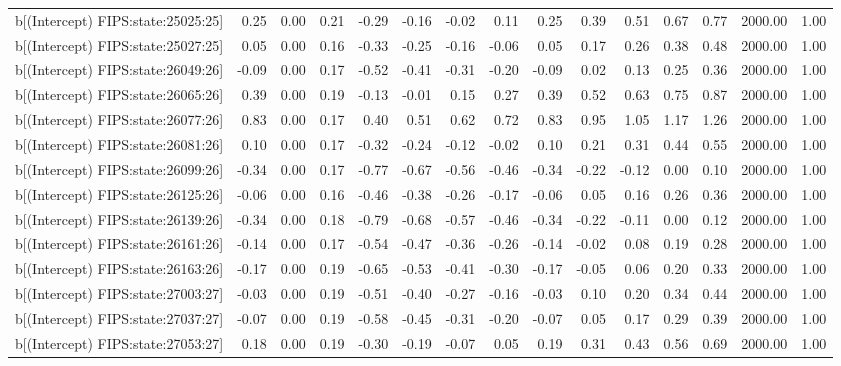\begin{table}[ht]
\begin{tabular}{rrrrrrrrrrrrrrr}
  b[(Intercept) FIPS:state:25025:25] & 0.25 & 0.00 & 0.21 & -0.29 & -0.16 & -0.02 & 0.11 & 0.25 & 0.39 & 0.51 & 0.67 & 0.77 & 2000.00 & 1.00 \\ 
  b[(Intercept) FIPS:state:25027:25] & 0.05 & 0.00 & 0.16 & -0.33 & -0.25 & -0.16 & -0.06 & 0.05 & 0.17 & 0.26 & 0.38 & 0.48 & 2000.00 & 1.00 \\ 
  b[(Intercept) FIPS:state:26049:26] & -0.09 & 0.00 & 0.17 & -0.52 & -0.41 & -0.31 & -0.20 & -0.09 & 0.02 & 0.13 & 0.25 & 0.36 & 2000.00 & 1.00 \\ 
  b[(Intercept) FIPS:state:26065:26] & 0.39 & 0.00 & 0.19 & -0.13 & -0.01 & 0.15 & 0.27 & 0.39 & 0.52 & 0.63 & 0.75 & 0.87 & 2000.00 & 1.00 \\ 
  b[(Intercept) FIPS:state:26077:26] & 0.83 & 0.00 & 0.17 & 0.40 & 0.51 & 0.62 & 0.72 & 0.83 & 0.95 & 1.05 & 1.17 & 1.26 & 2000.00 & 1.00 \\ 
  b[(Intercept) FIPS:state:26081:26] & 0.10 & 0.00 & 0.17 & -0.32 & -0.24 & -0.12 & -0.02 & 0.10 & 0.21 & 0.31 & 0.44 & 0.55 & 2000.00 & 1.00 \\ 
  b[(Intercept) FIPS:state:26099:26] & -0.34 & 0.00 & 0.17 & -0.77 & -0.67 & -0.56 & -0.46 & -0.34 & -0.22 & -0.12 & 0.00 & 0.10 & 2000.00 & 1.00 \\ 
  b[(Intercept) FIPS:state:26125:26] & -0.06 & 0.00 & 0.16 & -0.46 & -0.38 & -0.26 & -0.17 & -0.06 & 0.05 & 0.16 & 0.26 & 0.36 & 2000.00 & 1.00 \\ 
  b[(Intercept) FIPS:state:26139:26] & -0.34 & 0.00 & 0.18 & -0.79 & -0.68 & -0.57 & -0.46 & -0.34 & -0.22 & -0.11 & 0.00 & 0.12 & 2000.00 & 1.00 \\ 
  b[(Intercept) FIPS:state:26161:26] & -0.14 & 0.00 & 0.17 & -0.54 & -0.47 & -0.36 & -0.26 & -0.14 & -0.02 & 0.08 & 0.19 & 0.28 & 2000.00 & 1.00 \\ 
  b[(Intercept) FIPS:state:26163:26] & -0.17 & 0.00 & 0.19 & -0.65 & -0.53 & -0.41 & -0.30 & -0.17 & -0.05 & 0.06 & 0.20 & 0.33 & 2000.00 & 1.00 \\ 
  b[(Intercept) FIPS:state:27003:27] & -0.03 & 0.00 & 0.19 & -0.51 & -0.40 & -0.27 & -0.16 & -0.03 & 0.10 & 0.20 & 0.34 & 0.44 & 2000.00 & 1.00 \\ 
  b[(Intercept) FIPS:state:27037:27] & -0.07 & 0.00 & 0.19 & -0.58 & -0.45 & -0.31 & -0.20 & -0.07 & 0.05 & 0.17 & 0.29 & 0.39 & 2000.00 & 1.00 \\ 
  b[(Intercept) FIPS:state:27053:27] & 0.18 & 0.00 & 0.19 & -0.30 & -0.19 & -0.07 & 0.05 & 0.19 & 0.31 & 0.43 & 0.56 & 0.69 & 2000.00 & 1.00 \\ 

\end{tabular}
\end{table}
